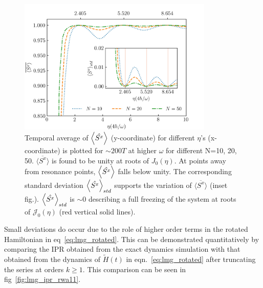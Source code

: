 \documentclass[%
reprint,
superscriptaddress,
amsmath,amssymb,
aps,
prb,
showkeys,
]{revtex4-2}
\begin{document}
	\begin{figure}[t!]
		\centering
		\includegraphics[width=9.3cm]{sx_conservation.jpeg}
		\caption{Temporal average of $\expval{\hat{S^x}}$ (y-coordinate) for different $\eta$'s (x-coordinate) is plotted for $\sim 200T$ at higher $\omega$ for different N=10, 20, 50. $\overline{\langle S^x \rangle}$ is found to be unity at roots of $J_0(\eta)$. At points away from resonance points, $\expval{\hat{S^x}}$ falls below unity. The corresponding standard deviation $\expval{\hat{S^x}}_{std}$ supports the variation of $\overline{\langle S^x \rangle}$ (inset fig.). $\expval{\hat{S^x}}_{std}$ is $\sim 0$ describing a full freezing of the system at roots of $\mathcal{J}_0(\eta)$ (red vertical solid lines).}
		\label{fig:sx_conserve}
	\end{figure}
	Small deviations do occur due to the role of  higher order terms in the rotated Hamiltonian in eq~\ref{eq:lmg_rotated}. This can be demonstrated quantitatively by comparing the IPR obtained from the exact dynamics simulation with that obtained from the dynamics of $\tilde{H}(t)$ in eqn.~\ref{eq:lmg_rotated} after truncating the series at orders $k\geq 1$. This comparison can be seen in fig~\ref{fig:lmg_ipr_rwa11}.
\end{document}
